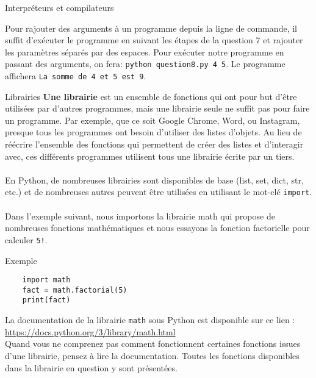 \begin{section}{Interpréteurs et compilateurs}
\begin{Exercice}[10 minutes]
        \begin{solution}
            Pour rajouter des arguments à un programme depuis la ligne de commande, il suffit d'exécuter le programme en suivant les étapes de la question 7 et rajouter les paramètres séparés par des espaces. Pour exécuter notre programme en passant des arguments, on fera: \lstinline{python question8.py 4 5}. Le programme affichera \lstinline{La somme de 4 et 5 est 9}.
        \end{solution}

        
    \end{Exercice}
    
\end{section}
\begin{section}{Librairies}
    \textbf{Une librairie} est un ensemble de fonctions qui ont pour but d'être utilisées par d'autres programmes, mais une librairie seule ne suffit pas pour faire un programme. Par exemple, que ce soit Google Chrome, Word, ou Instagram, presque tous les programmes ont besoin d'utiliser des listes d'objets. Au lieu de réécrire l'ensemble des fonctions qui permettent de créer des listes et d'interagir avec, ces différents programmes utilisent tous une librairie écrite par un tiers.
\\\\
En Python, de nombreuses librairies sont disponibles de base (list, set, dict, str, etc.) et de nombreuses autres peuvent être utilisées en utilisant le mot-clé \lstinline{import}.
\\\\
Dans l'exemple suivant, nous importons la librairie math qui propose de nombreuses fonctions mathématiques et nous essayons la fonction factorielle pour calculer \lstinline{5!}.
\begin{Example}{\faTerminal Exemple}
    \begin{lstlisting}
    import math
    fact = math.factorial(5)
    print(fact)\end{lstlisting}
\end{Example}

\begin{conseil}
	La documentation de la librairie \lstinline{math} sous Python est disponible sur ce lien : \url{https://docs.python.org/3/library/math.html} \\
Quand vous ne comprenez pas comment fonctionnent certaines fonctions issues d'une librairie, pensez à lire la documentation. Toutes les fonctions disponibles dans la librairie en question y sont présentées.


\end{conseil}
\end{section}
